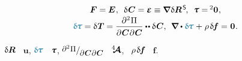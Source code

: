 \nopagebreak\begin{equation}\begin{array}{c}
\bm{F} = \bm{E} \hspace{.1ex} ,
\:\;
\variation{\hspace{.12ex}\bm{C}} = \mathboldepsilon \equiv \boldnabla \hspace{.12ex} \variation{\bm{R}}^{\hspace{0.2ex}\mathsf{S}} \hspace{-0.2ex} ,
\:\;
\mathboldtau = {\hspace{-0.2ex}^2\bm{0}}
\hspace{.1ex} ,
\\[.1em]
%
\varbivalent{\hspace{-0.2ex}\cauchystress}
= \variation{\hspace{.1ex}\firstpiolakirchhoffstress}
= \displaystyle \frac{\partial^2 \hspace{.1ex} \Pi}{\raisemath{-0.1em}{\partial \hspace{.1ex} \bm{C} \hspace{.1ex} \partial \hspace{0.1ex} \bm{C}}} \dotdotp \variation{\hspace{.12ex}\bm{C}} ,
\:\:
\boldnabla \dotp \varbivalent{\hspace{-0.2ex}\cauchystress} \hspace{.1ex}
+ \hspace{.1ex} \rho \hspace{.25ex} \variation{\hspace{-0.2ex}\bm{f}}
= \hspace{.1ex} \bm{0}
\hspace{.1ex} .
\end{array}\end{equation}

\noindent {} ${\updelta\hspace{-0.1ex}\bm{R}}$ ~$\bm{u}$, $\varbivalent{\hspace{-0.2ex}\cauchystress}$ ~$\mathboldtau$, ${\scalebox{0.98}[1]{$\raisemath{0.16em}{\scalebox{0.92}[0.92]{$\partial^2 \hspace{0.1ex} \Pi$}} / \hspace{-0.1ex} \raisemath{-0.32em}{\scalebox{0.92}[0.92]{$\partial \hspace{0.1ex} \bm{C} \hspace{0.1ex} \partial \hspace{0.1ex} \bm{C}$}}\hspace{0.12ex}$}}$ ~$\hspace{.08ex}{^4\hspace{-0.72ex}\bm{\mathcal{A}}}\hspace{.08ex}$, ~${\rho \hspace{.25ex} \variation{\hspace{-0.2ex}\bm{f}}}$ ~$\bm{f}$\hbox{\hspace{-0.2ex}.}

